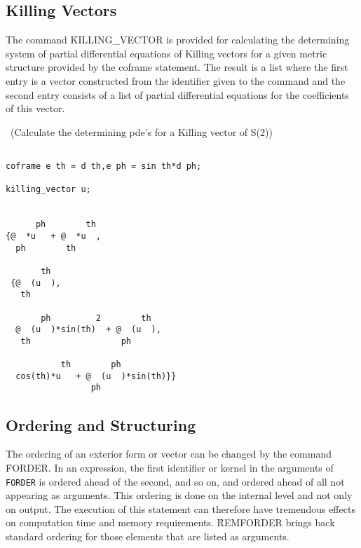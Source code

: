 \subsection{Killing Vectors}

The command \f{KILLING\_VECTOR} is provided for calculating the
 \label{KILLING_VECTOR}
\hypertarget{command:KILLING_VECTOR}{}
determining system of partial differential equations of Killing vectors for
a given metric structure provided by the coframe statement.  The result is
a list where the first entry is a vector constructed from the identifier
given to the command and the second entry consists of a list of partial
differential equations for the coefficients of this vector.

\example\ (Calculate the determining pde's for a Killing vector of S(2))
\begin{verbatim}

coframe e th = d th,e ph = sin th*d ph;

killing_vector u;


      ph        th
{@  *u   + @  *u  ,
  ph        th

       th
 {@  (u  ),
   th

       ph         2        th
  @  (u  )*sin(th)  + @  (u  ),
   th                  ph

           th        ph
  cos(th)*u   + @  (u  )*sin(th)}}
                 ph

\end{verbatim}


\subsection{Ordering and Structuring}

 
\hypertarget{command:FORDER}{}
The ordering of an exterior form or vector can be changed by the
command \f{FORDER}.\label{FORDER}  In an expression, the first
identifier or kernel in the arguments of \texttt{FORDER} is ordered ahead
of the second, and so on, and ordered ahead of all not appearing as
arguments.  This ordering is done on the internal level and not only
on output.  The execution of this statement can therefore have
tremendous effects on computation time and memory requirements.
\f{REMFORDER}\label{REMFORDER} brings back standard ordering for those
elements that are listed as arguments. 

